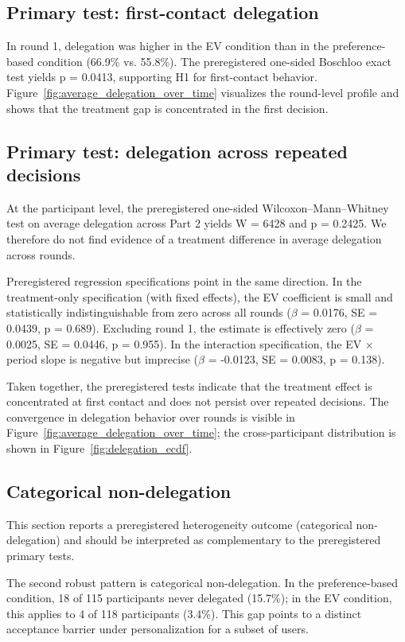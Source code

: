 \documentclass[a4paper, 12pt, fleqn]{article}
\theoremstyle{definition}
\begin{document}
\subsection{Primary test: first-contact delegation}
In round 1, delegation was higher in the EV condition than in the preference-based condition (66.9\% vs. 55.8\%). The preregistered one-sided Boschloo exact test yields p = 0.0413, supporting H1 for first-contact behavior.
Figure~\ref{fig:average_delegation_over_time} visualizes the round-level profile and shows that the treatment gap is concentrated in the first decision.

\subsection{Primary test: delegation across repeated decisions}
At the participant level, the preregistered one-sided Wilcoxon--Mann--Whitney test on average delegation across Part 2 yields W = 6428 and p = 0.2425. We therefore do not find evidence of a treatment difference in average delegation across rounds.

Preregistered regression specifications point in the same direction. In the treatment-only specification (with fixed effects), the EV coefficient is small and statistically indistinguishable from zero across all rounds ($\beta$ = 0.0176, SE = 0.0439, p = 0.689). Excluding round 1, the estimate is effectively zero ($\beta$ = 0.0025, SE = 0.0446, p = 0.955). In the interaction specification, the EV $\times$ period slope is negative but imprecise ($\beta$ = -0.0123, SE = 0.0083, p = 0.138).

Taken together, the preregistered tests indicate that the treatment effect is concentrated at first contact and does not persist over repeated decisions. The convergence in delegation behavior over rounds is visible in Figure~\ref{fig:average_delegation_over_time}; the cross-participant distribution is shown in Figure~\ref{fig:delegation_ecdf}.

\subsection{Categorical non-delegation}
This section reports a preregistered heterogeneity outcome (categorical non-delegation) and should be interpreted as complementary to the preregistered primary tests.

The second robust pattern is categorical non-delegation. In the preference-based condition, 18 of 115 participants never delegated (15.7\%); in the EV condition, this applies to 4 of 118 participants (3.4\%). This gap points to a distinct acceptance barrier under personalization for a subset of users.
\end{document}
